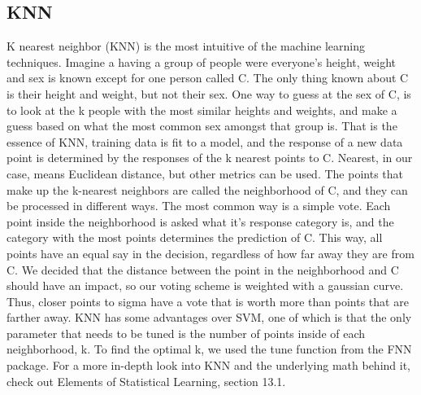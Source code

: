 \documentclass[11pt, oneside]{article}   	%
\begin{document}
\subsection{KNN}
K nearest neighbor (KNN) is the most intuitive of the machine learning techniques. Imagine a having a group of people were everyone's height, weight and sex is known except for one person called C.   The only thing known about C is their height and weight, but not their sex. One way to guess at the sex of C, is to look at the k people with the most similar heights and weights, and make a guess based on what the most common sex amongst that group is. That is the essence of KNN, training data is fit to a model, and the response of a new data point is determined by the responses of the k nearest points to C. Nearest, in our case, means Euclidean distance, but other metrics can be used. The points that make up the k-nearest neighbors are called the neighborhood of C, and they can be processed in different ways. The most common way is a simple vote. Each point inside the neighborhood is asked what it's response category is, and the category with the most points determines the prediction of C. This way, all points have an equal say in the decision, regardless of how far away they are from C. We decided that the distance between the point in the neighborhood and C should have an impact, so our voting scheme is weighted with a gaussian curve. Thus, closer points to sigma have a vote that is worth more than points that are farther away. KNN has some advantages over SVM, one of which is that the only parameter that needs to be tuned is the number of points inside of each neighborhood, k. To find the optimal k, we used the tune function from the FNN package. \cite{FNN} For a more in-depth look into KNN and the underlying math behind it, check out Elements of Statistical Learning, section 13.1. \cite{KNNBook}
\end{document}
